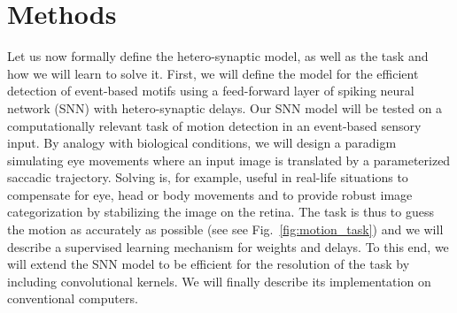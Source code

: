 \documentclass[default]{sn-jnl}%
\theoremstyle{thmstyleone}%
\theoremstyle{thmstyletwo}%
\theoremstyle{thmstylethree}%
\newcommand{\seeFig}[1]{see Fig.~\ref{fig:#1}}%
\begin{document}
\section{Methods}
\label{sec:methods}
Let us now formally define the hetero-synaptic model, as well as the task and how we will learn to solve it. First, we will define the model for the efficient detection of event-based motifs using a feed-forward layer of spiking neural network (SNN) with hetero-synaptic delays. Our SNN model will be tested on a computationally relevant task of motion detection in an event-based sensory input. By analogy with biological conditions, we will design a paradigm simulating eye movements where an input image is translated by a parameterized saccadic trajectory. Solving is, for example, useful in real-life situations to compensate for eye, head or body movements and to provide robust image categorization by stabilizing the image on the retina. The task is thus to guess the motion as accurately as possible (see \seeFig{motion_task}) and we will describe a supervised learning mechanism for weights and delays. To this end, we will extend the SNN model to be efficient for the resolution of the task by including convolutional kernels. We will finally describe its implementation on conventional computers. 
%
\end{document}
